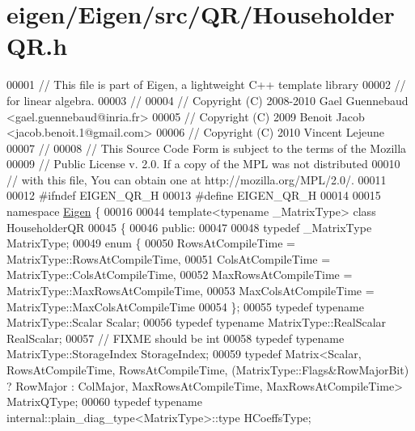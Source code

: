 \hypertarget{eigen_2_eigen_2src_2_q_r_2_householder_q_r_8h_source}{}\section{eigen/\+Eigen/src/\+Q\+R/\+Householder\+QR.h}
\label{eigen_2_eigen_2src_2_q_r_2_householder_q_r_8h_source}

\begin{DoxyCode}
00001 \textcolor{comment}{// This file is part of Eigen, a lightweight C++ template library}
00002 \textcolor{comment}{// for linear algebra.}
00003 \textcolor{comment}{//}
00004 \textcolor{comment}{// Copyright (C) 2008-2010 Gael Guennebaud <gael.guennebaud@inria.fr>}
00005 \textcolor{comment}{// Copyright (C) 2009 Benoit Jacob <jacob.benoit.1@gmail.com>}
00006 \textcolor{comment}{// Copyright (C) 2010 Vincent Lejeune}
00007 \textcolor{comment}{//}
00008 \textcolor{comment}{// This Source Code Form is subject to the terms of the Mozilla}
00009 \textcolor{comment}{// Public License v. 2.0. If a copy of the MPL was not distributed}
00010 \textcolor{comment}{// with this file, You can obtain one at http://mozilla.org/MPL/2.0/.}
00011 
00012 \textcolor{preprocessor}{#ifndef EIGEN\_QR\_H}
00013 \textcolor{preprocessor}{#define EIGEN\_QR\_H}
00014 
00015 \textcolor{keyword}{namespace }\hyperlink{namespace_eigen}{Eigen} \{ 
00016 
00044 \textcolor{keyword}{template}<\textcolor{keyword}{typename} \_MatrixType> \textcolor{keyword}{class }HouseholderQR
00045 \{
00046   \textcolor{keyword}{public}:
00047 
00048     \textcolor{keyword}{typedef} \_MatrixType MatrixType;
00049     \textcolor{keyword}{enum} \{
00050       RowsAtCompileTime = MatrixType::RowsAtCompileTime,
00051       ColsAtCompileTime = MatrixType::ColsAtCompileTime,
00052       MaxRowsAtCompileTime = MatrixType::MaxRowsAtCompileTime,
00053       MaxColsAtCompileTime = MatrixType::MaxColsAtCompileTime
00054     \};
00055     \textcolor{keyword}{typedef} \textcolor{keyword}{typename} MatrixType::Scalar Scalar;
00056     \textcolor{keyword}{typedef} \textcolor{keyword}{typename} MatrixType::RealScalar RealScalar;
00057     \textcolor{comment}{// FIXME should be int}
00058     \textcolor{keyword}{typedef} \textcolor{keyword}{typename} MatrixType::StorageIndex StorageIndex;
00059     \textcolor{keyword}{typedef} Matrix<Scalar, RowsAtCompileTime, RowsAtCompileTime, (MatrixType::Flags&RowMajorBit) ? RowMajor
       : ColMajor, MaxRowsAtCompileTime, MaxRowsAtCompileTime> MatrixQType;
00060     \textcolor{keyword}{typedef} \textcolor{keyword}{typename} internal::plain\_diag\_type<MatrixType>::type HCoeffsType;

\end{DoxyCode}
